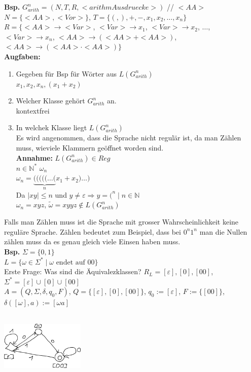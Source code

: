\documentclass[a4paper,10pt,landscape,twocolumn]{article}
\newcommand{\NN}{\mathbb{N}} %
\newcommand{\Bold}[1]{\textbf{#1}} %
\newcommand{\T}[1]{\text{#1}} %
\newcommand{\Ra}{\Rightarrow}
\begin{document}
\Bold{Bsp.} $G_{arith}^n=(N,T,R,<arithm Ausdruecke>)$ // $<AA>$\\
$N=\{<AA>,<Vor>\}$, $T=\{(,),+,-,x_1,x_2,\dots,x_n\}$\\
$R=\{<AA>\to<Var>$, $<Var>\to x_1$, $<Var>\to x_2$, $\dots$, $<Var>\to x_n$, $<AA>\to(<AA>+<AA>)$, $<AA>\to(<AA>\cdot <AA>)\}$\\
\Bold{Augfaben:}
\begin{enumerate}
 \item Gegeben f\"ur Bsp f\"ur W\"orter aus $L(G^n_{arith})$\\
 $x_1,x_2,x_n,(x_1+x_2)$
 \item Welcher Klasse geh\"ort $G^n_{arith}$ an.\\
 kontextfrei
 \item In welchek Klasse liegt $L(G^n_{arith})$\\
 Es wird angenommen, dass die Sprache nicht regul\"ar ist, da man Z\"ahlen muss, wieviele Klammern ge\"offnet worden sind.\\
 \Bold{Annahme:} $L(G^n_{arith})\in Reg$\\
 $n\in \NN^*$ $\omega_n$\\
 $\omega_n = \underbrace{(((((\dots(}_nx_1+x_2)\dots)$\\
 Da $\mid xy\mid\leq n$ und $y\neq\varepsilon\Ra y=(^n\mid n\in\NN$\\
 $\omega_n=xyz$, $\tilde{\omega}=xyyz\notin L(G^n_{arith})$
\end{enumerate}
Falls man Z\"ahlen muss ist die Sprache mit grosser Wahrscheinlichkeit keine regul\"are Sprache. Z\"ahlen bedeutet zum Beispiel, dass bei $0^n1^n$ man die Nullen z\"ahlen muss da es genau gleich viele Einsen haben muss.\\
\Bold{Bsp.} $\Sigma=\{0,1\}$\\
$L=\{\omega\in\Sigma^*\mid\omega\T{ endet auf }00\}$\\
Erste Frage: Was sind die \"Aquivalezklassen? $R_L=[\varepsilon],[0],[00]$, $\Sigma^*=[\varepsilon]\cup[0]\cup[00]$\\
$A=(Q,\Sigma,\delta,q_0,F)$, $Q=\{[\varepsilon],[0],[00]\}$, $q_0:=[\varepsilon]$, $F:=\{[00]\}$, $\delta([\omega],a):=[\omega a]$\\
\includegraphics[width=0.3\textwidth,height=4cm,keepaspectratio]{Bild17.eps}\\
\end{document}
